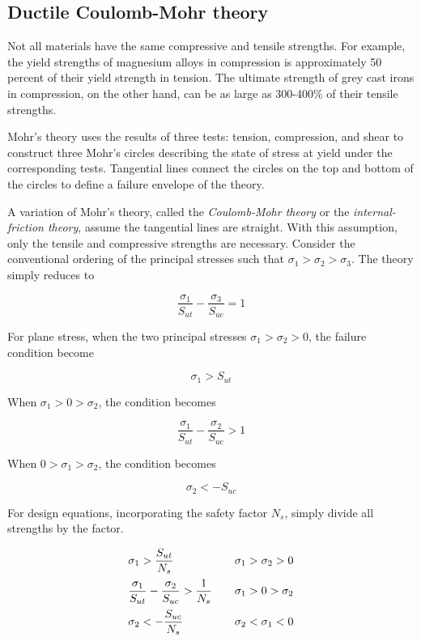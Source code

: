 \documentclass[a4paper,openany,12pt]{book}
\begin{document}
\subsection{Ductile Coulomb-Mohr theory}
\label{sec:org18569d8}
Not all materials have the same compressive and tensile strengths. For
example, the yield strengths of magnesium alloys in compression is
approximately 50 percent of their yield strength in tension. The
ultimate strength of grey cast irons in compression, on the other hand,
can be as large as 300-400\% of their tensile strengths.

Mohr's theory uses the results of three tests: tension, compression, and
shear to construct three Mohr's circles describing the state of stress
at yield under the corresponding tests. Tangential lines connect the
circles on the top and bottom of the circles to define a failure
envelope of the theory.

A variation of Mohr's theory, called the \emph{Coulomb-Mohr theory} or the
\emph{internal-friction theory}, assume the tangential lines are straight.
With this assumption, only the tensile and compressive strengths are
necessary. Consider the conventional ordering of the principal stresses
such that \(\sigma_1 > \sigma_2 > \sigma_3\). The theory simply reduces to

$$\frac{\sigma_1}{S_{ut}} - \frac{\sigma_3}{S_{uc}} = 1$$

For plane stress, when the two principal stresses
\(\sigma_1 > \sigma_2 > 0\), the failure condition become

$$\sigma_1 > S_{ut}$$

When \(\sigma_1 > 0 > \sigma_2\), the condition becomes

$$\frac{\sigma_1}{S_{ut}} - \frac{\sigma_2}{S_{uc}} > 1$$

When \(0 > \sigma_1 > \sigma_2\), the condition becomes

$$\sigma_2 <  - S_{uc}$$


For design equations, incorporating the safety factor \(N_s\), simply
divide all strengths by the factor.

$$\begin{array}{l l l}
  \sigma_1 > \dfrac{S_{ut}}{N_s} & & \sigma_1 > \sigma_2 > 0 \\[10pt]
  \dfrac{\sigma_1}{S_{ut}} - \dfrac{\sigma_2}{S_{uc}} > \dfrac{1}{N_s} & & \sigma_1 > 0 > \sigma_2 \\[10pt]
    \sigma_2 <  -\dfrac{S_{uc}}{N_s} & & \sigma_2 < \sigma_1 < 0
  \end{array}$$
\end{document}
